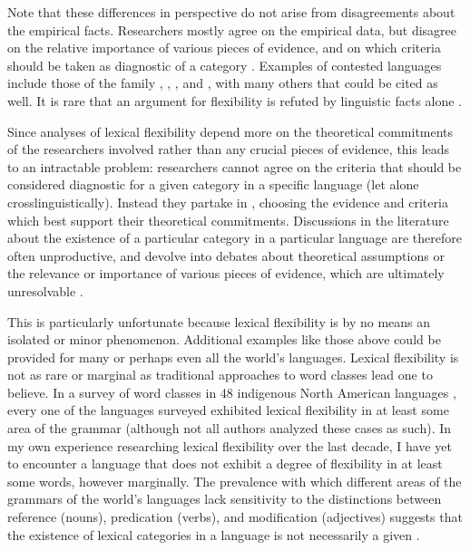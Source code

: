 Note that these differences in perspective do not arise from disagreements about the empirical facts. Researchers mostly agree on the empirical data, but disagree on the relative importance of various pieces of evidence, and on which criteria should be taken as diagnostic of a category \parencites[235]{Wetzer1992}[32]{Stassen1997}[58]{CroftLier2012}. Examples of contested languages include those of the  family \parencite{Chafe2012},  \parencites{EvansOsada2005}{HengeveldRijkhoff2005},  \parencites[17]{SchachterShopen2007}{Floyd2011}, and  \parencites[352]{Robins1968}[62--63]{Hardjadibrata1985}, with many others that could be cited as well. It is rare that an argument for flexibility is refuted by linguistic facts alone .

Since analyses of lexical flexibility depend more on the theoretical commitments of the researchers involved rather than any crucial pieces of evidence, this leads to an intractable problem: researchers cannot agree on the criteria that should be considered diagnostic for a given category in a specific language (let alone crosslinguistically). Instead they partake in  \parencite[30]{Croft2001b}, choosing the evidence and criteria which best support their theoretical commitments. Discussions in the literature about the existence of a particular category in a particular language are therefore often unproductive, and devolve into debates about theoretical assumptions or the relevance or importance of various pieces of evidence, which are ultimately unresolvable \parencite[435]{Croft2005}.

This is particularly unfortunate because lexical flexibility is by no means an isolated or minor phenomenon. Additional examples like those above could be provided for many or perhaps even all the world's languages. Lexical flexibility is not as rare or marginal as traditional approaches to word classes lead one to believe. In a survey of word classes in 48 indigenous North American languages \parencite{Hieberfc}, every one of the languages surveyed exhibited lexical flexibility in at least some area of the grammar (although not all authors analyzed these cases as such). In my own experience researching lexical flexibility over the last decade, I have yet to encounter a language that does not exhibit a degree of flexibility in at least some words, however marginally. The prevalence with which different areas of the grammars of the world's languages lack sensitivity to the distinctions between reference (nouns), predication (verbs), and modification (adjectives) suggests that the existence of lexical categories in a language is not necessarily a given \parencite{Hieberfc}.

